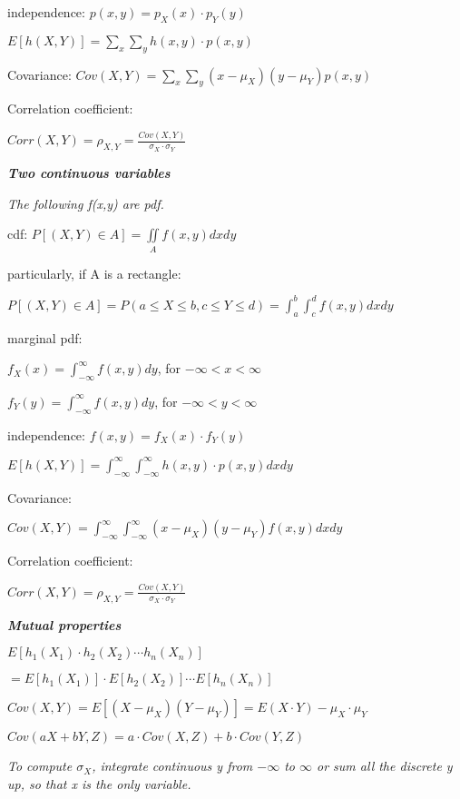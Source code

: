 \documentclass{article}
\newcommand{\smalltitle}[1]{
	\noindent
	\textbf{\textit{#1}}
}
\begin{document}
	independence:
	$p(x,y) = p_X(x)\cdot p_Y(y)$
	
	$E[h(X,Y)] = \sum \limits_x\sum \limits_y h(x,y)\cdot p(x,y)$
	
	Covariance: $Cov(X,Y) = \sum \limits_{x}\sum \limits_{y}(x-\mu_X)(y-\mu_Y)p(x,y)$
	
	Correlation coefficient:
	
	$Corr(X,Y) = \rho_{X,Y} = \frac{Cov(X,Y)}{\sigma_X \cdot \sigma_Y} $
	
	
	
	\smalltitle{Two continuous variables}
	
	\textit{The following f(x,y) are pdf.}
	
	cdf: $P[(X,Y)\in A] = \iint \limits_{A} f(x,y)dxdy$
	
	
	particularly, if A is a rectangle:
	
	\noindent
	$P[(X,Y)\in A] =P(a\leq X\leq b, c\leq Y\leq d)= \int_{a}^{b}\int_{c}^{d} f(x,y)dxdy$
	
	
	
	marginal pdf:
	
	$f_X(x) = \int_{-\infty}^{\infty} f(x,y)dy$, for $-\infty < x < \infty$
	
	
	
	$f_Y(y) = \int_{-\infty}^{\infty} f(x,y)dy$, for $-\infty < y < \infty$
	
	
	independence:
	$f(x,y) = f_X(x)\cdot f_Y(y)$
	
	$E[h(X,Y)] = \int_{-\infty}^{\infty}\int_{-\infty}^{\infty}h(x,y)\cdot p(x,y)dxdy$
	
	Covariance:
	
	$Cov(X,Y) = \int_{-\infty}^{\infty}\int_{-\infty}^{\infty}(x-\mu_X)(y-\mu_Y)f(x,y)dxdy$
	
	Correlation coefficient:
	
	$Corr(X,Y) = \rho_{X,Y} = \frac{Cov(X,Y)}{\sigma_X \cdot \sigma_Y} $
	
	
	
	\smalltitle{Mutual properties}
	
	$E[h_1(X_1)\cdot h_2(X_2) \cdots h_n(X_n)]$
	
	$ = E[h_1(X_1)] \cdot E[h_2(X_2)] \cdots E[h_n(X_n)] $
	
	$Cov(X,Y) = E[(X-\mu_X)(Y-\mu_Y)] = E(X\cdot Y)-\mu_X \cdot \mu_Y$
	
	$Cov(aX+bY,Z) = a\cdot Cov(X,Z)+b\cdot Cov(Y,Z)$
	
	
	
	\textit{To compute $\sigma_X$, integrate continuous y from $-\infty$ to $\infty$ or sum all the discrete y up, so that x is the only variable.}
	
\end{document}
